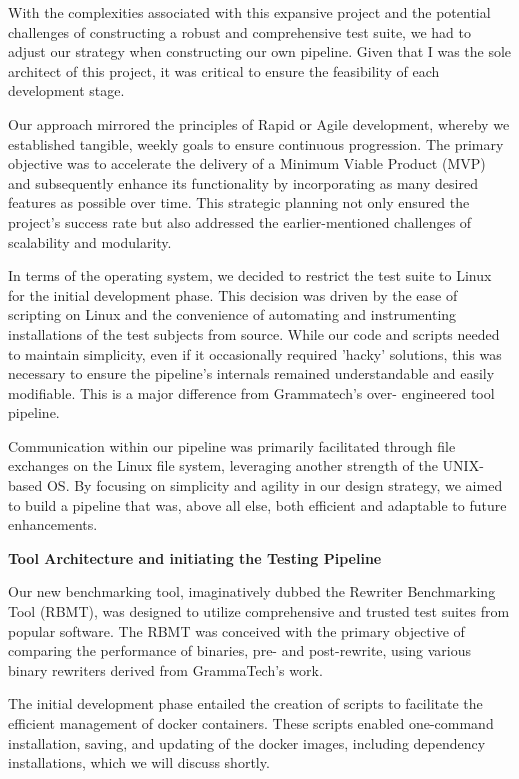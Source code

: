 \documentclass[a4paper,11pt,oneside]{report}
\begin{document}
With the complexities associated with this expansive project and the potential
challenges of constructing a robust and comprehensive test suite, we had to adjust our
strategy when constructing our own pipeline. Given that I was the sole architect of this
project, it was critical to ensure the feasibility of each development stage.

Our approach mirrored the principles of Rapid or Agile development, whereby we
established tangible, weekly goals to ensure continuous progression. The primary objective
was to accelerate the delivery of a Minimum Viable Product (MVP) and subsequently
enhance its functionality by incorporating as many desired features as possible over time.
This strategic planning not only ensured the project's success rate but also addressed the
earlier-mentioned challenges of scalability and modularity.

In terms of the operating system, we decided to restrict the test suite to Linux for
the initial development phase. This decision was driven by the ease of scripting on Linux and
the convenience of automating and instrumenting installations of the test subjects from
source. While our code and scripts needed to maintain simplicity, even if it occasionally
required 'hacky' solutions, this was necessary to ensure the pipeline's internals remained
understandable and easily modifiable. This is a major difference from Grammatech’s over-
engineered tool pipeline.

Communication within our pipeline was primarily facilitated through file exchanges
on the Linux file system, leveraging another strength of the UNIX-based OS. By focusing on
simplicity and agility in our design strategy, we aimed to build a pipeline that was, above all
else, both efficient and adaptable to future enhancements.

\textbf{Tool Architecture and initiating the Testing Pipeline}

Our new benchmarking tool, imaginatively dubbed the Rewriter Benchmarking Tool
(RBMT), was designed to utilize comprehensive and trusted test suites from popular
software. The RBMT was conceived with the primary objective of comparing the
performance of binaries, pre- and post-rewrite, using various binary rewriters derived from
GrammaTech's work.

The initial development phase entailed the creation of scripts to facilitate the
efficient management of docker containers. These scripts enabled one-command
installation, saving, and updating of the docker images, including dependency installations,
which we will discuss shortly.
\end{document}
